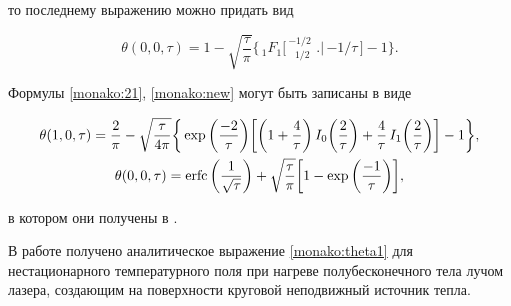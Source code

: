 то последнему выражению можно придать вид

\begin{equation}

\theta (0,0,\tau)=1-\sqrt{\frac{\tau}{\pi}}\Bigg\{\,_{1}F_{1}\bigg[\,^{\displaystyle -1 / 2}_{\displaystyle \,\,\,\, 1 / 2}\,\,\bigg.\bigg|\,{-1}/{\tau}\,\bigg]-1\Bigg\}.

\label{monako:new}

\end{equation}



Формулы \eqref{monako:21}, \eqref{monako:new} могут быть записаны в виде 

%


\begin{gather}

\label{monako:101}

\theta (1, 0, \tau)=\frac{2}{\pi}-\sqrt{\frac{\tau}{4\pi}}\bigg\{\exp\bigg(\frac{-2}{\tau}\bigg)\bigg[\bigg(1+\frac{4}{\tau}\bigg)\,I_0\bigg(\frac{2}{\tau}\bigg)+\frac{4}{\tau}\,I_1\bigg(\frac{2}{\tau}\bigg) \bigg]-1\bigg\},

\\

\label{monako:100}

\theta (0, 0, \tau)=\mathop{\rm erfc}\bigg(\frac{1}{\sqrt{\tau}}\bigg)+\sqrt{\frac{\tau}{\pi}}\bigg[1-\exp\bigg(\frac{-1}{\tau}\bigg)\bigg],

\end{gather}

в котором они получены в \cite{manako:pinsker}. %



%




\newpage



 В работе получено аналитическое выражение \eqref{monako:theta1} для нестационарного температурного поля при нагреве полубесконечного тела лучом лазера, создающим на поверхности круговой неподвижный источник тепла. 


